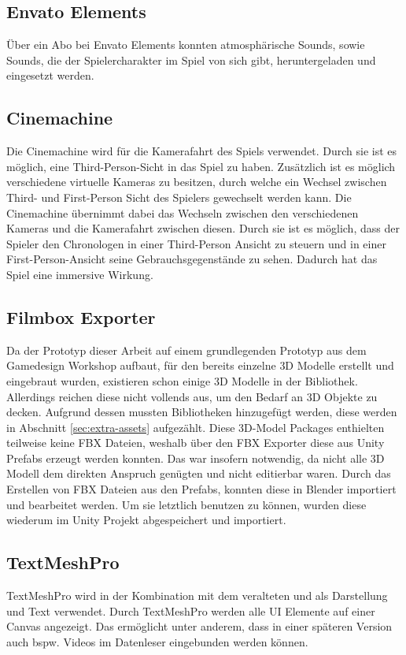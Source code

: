 \subsection{Envato Elements}
Über ein Abo bei Envato Elements konnten atmosphärische Sounds, sowie Sounds, die der Spielercharakter im Spiel von sich gibt, heruntergeladen und eingesetzt werden.

\subsection{Cinemachine}
Die Cinemachine wird für die Kamerafahrt des Spiels verwendet. Durch sie ist es möglich, eine Third-Person-Sicht in das Spiel zu haben. Zusätzlich ist es möglich verschiedene virtuelle Kameras zu besitzen, durch welche ein Wechsel zwischen Third- und First-Person Sicht des Spielers gewechselt werden kann. Die Cinemachine übernimmt dabei das Wechseln zwischen den verschiedenen Kameras und die Kamerafahrt zwischen diesen. Durch sie ist es möglich, dass der Spieler den Chronologen in einer Third-Person Ansicht zu steuern und in einer First-Person-Ansicht seine Gebrauchsgegenstände zu sehen. Dadurch hat das Spiel eine immersive Wirkung.

\subsection{Filmbox Exporter}
Da der Prototyp dieser Arbeit auf einem grundlegenden Prototyp aus dem Gamedesign Workshop aufbaut, für den bereits einzelne \ac{3D} Modelle erstellt und eingebraut wurden, existieren schon einige \ac{3D} Modelle in der Bibliothek. Allerdings reichen diese nicht vollends aus, um den Bedarf an \ac{3D} Objekte zu decken. Aufgrund dessen mussten Bibliotheken hinzugefügt werden, diese werden in Abschnitt \ref{sec:extra-assets}  aufgezählt. Diese \ac{3D}-Model Packages enthielten teilweise keine \ac{FBX} Dateien, weshalb über den \ac{FBX} Exporter diese aus Unity Prefabs erzeugt werden konnten. Das war insofern notwendig, da nicht alle \ac{3D} Modell dem direkten Anspruch genügten und nicht editierbar waren. Durch das Erstellen von \ac{FBX} Dateien aus den Prefabs, konnten diese in Blender importiert und bearbeitet werden. Um sie letztlich benutzen zu können, wurden diese wiederum im Unity Projekt abgespeichert und importiert.

\subsection{TextMeshPro}
TextMeshPro wird in der Kombination mit dem veralteten  und  als Darstellung und Text verwendet. Durch TextMeshPro werden alle \ac{UI} Elemente auf einer Canvas angezeigt. Das ermöglicht unter anderem, dass in einer späteren Version auch bspw. Videos im Datenleser eingebunden werden können.

